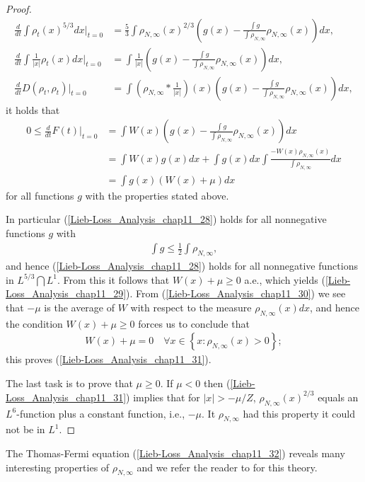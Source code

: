 \documentclass[openany, a4paper, oneside]{book}
\theoremstyle{break}
\theoremstyle{breakdefn}
\newcommand{\abs}[1]{\left|#1\right|}
\newcommand{\rbk}[1]{\left (#1\right)}
\newcommand{\set}[2]{\left\{#1 : #2\right\}}
\newcommand{\rhoNinfty}{\rho_{N, \infty}}
\begin{document}
\begin{proof}
\begin{align}
 \frac{d}{dt} \int \rho_t (x)^{5/3} dx \Big |_{t = 0}
 &=
 \frac{5}{3} \int \rhoNinfty (x)^{2/3} \rbk{g (x) - \frac{\int g}{\int \rhoNinfty} \rhoNinfty (x)} dx, \\
 \frac{d}{dt} \int \frac{1}{\abs{x}} \rho_t (x) dx \Big |_{t = 0}
 &=
 \int \frac{1}{\abs{x}} \rbk{g (x) - \frac{\int g}{\int \rhoNinfty} \rhoNinfty (x)} dx, \\
 \frac{d}{dt} D \rbk{\rho_t, \rho_t} \Big |_{t = 0}
 &=
 \int \rbk{\rhoNinfty * \frac{1}{\abs{x}}} (x) \rbk{g (x) - \frac{\int g}{\int \rhoNinfty} \rhoNinfty (x)} dx,
\end{align}
it holds that
\begin{align}
 0 \leq
 \frac{d}{dt} F (t) \Big |_{t = 0}
 &=
 \int W (x) \rbk{g (x) - \frac{\int g}{\int \rhoNinfty} \rhoNinfty (x)} dx \\
 &=
 \int W (x) g (x) dx + \int g (x) dx \int \frac{- W (x) \rhoNinfty (x)}{\int \rhoNinfty} dx \\
 &=
 \int g (x) \rbk{W (x) + \mu} dx \label{Lieb-Loss_Analysis_chap11_28}
\end{align}
for all functions $g$ with the properties stated above.

In particular (\ref{Lieb-Loss_Analysis_chap11_28}) holds for all nonnegative functions $g$ with
\begin{align}
 \int g \leq \frac{1}{2} \int \rhoNinfty,
\end{align}
and hence (\ref{Lieb-Loss_Analysis_chap11_28}) holds for all nonnegative functions in $L^{5/3} \bigcap L^{1}$.
From this it follows that $W (x) + \mu \geq 0$ a.e., which yields (\ref{Lieb-Loss_Analysis_chap11_29}).
From (\ref{Lieb-Loss_Analysis_chap11_30}) we see that $- \mu$ is the average of $W$ with respect to the measure $\rhoNinfty (x) dx$,
and hence the condition $W (x) + \mu \geq 0$ forces us to conclude that
\begin{align}
 W (x) + \mu = 0 \quad \forall x \in \set{x}{\rhoNinfty (x) > 0};
\end{align}
this proves (\ref{Lieb-Loss_Analysis_chap11_31}).

The last task is to prove that $\mu \geq 0$.
If $\mu < 0$ then (\ref{Lieb-Loss_Analysis_chap11_31}) implies that for $\abs{x} > - \mu / Z$, $\rhoNinfty (x)^{2/3}$ equals
an $L^6$-function plus a constant function, i.e., $- \mu$.
It $\rhoNinfty$ had this property it could not be in $L^1$.
\end{proof}

The Thomas-Fermi equation (\ref{Lieb-Loss_Analysis_chap11_32}) reveals many interesting properties of $\rhoNinfty$
and we refer the reader to \cite{LiebSimon1} for this theory.
\end{document}
